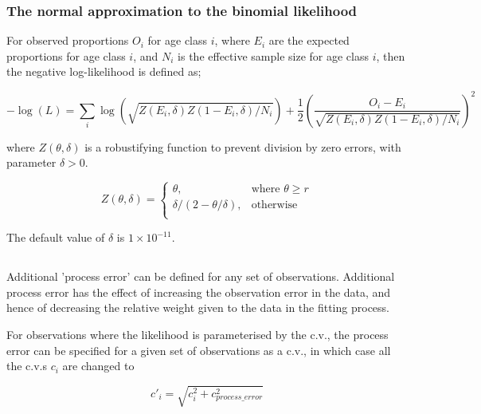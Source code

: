 \subsubsection*{The normal approximation to the binomial likelihood}

For observed proportions $O_i$ for age class $i$, where $E_i$ are the expected proportions for age class $i$, and $N_i$ is the effective sample size for age class $i$, then the negative log-likelihood is defined as;

\begin{equation}
-\log \left(L \right)= \sum\limits_i \log \left( \sqrt{Z\left(E_i,\delta \right)Z\left(1-E_i,\delta\right)/N_i} \right) + \frac{1}{2} \left( \frac{O_i-E_i}{\sqrt{Z\left(E_i,\delta\right)Z\left(1-E_i,\delta \right)/N_i}} \right)^2
\end{equation}

where $Z \left(\theta,\delta \right)$ is a robustifying function to prevent division by zero errors, with parameter $\delta>0$.

\begin{equation}
Z \left(\theta,\delta \right) = \begin{cases}
\theta, & \text{where $\theta \ge r$} \\
\delta/\left( 2-\theta/\delta \right), & \text{otherwise} \\
\end{cases}
\end{equation}

The default value of $\delta$ is $1 \times 10^{-11}$.

\subsection{}

Additional 'process error' can be defined for any set of observations. Additional process error has the effect of increasing the observation error in the data, and hence of decreasing the relative weight given to the data in the fitting process.

For observations where the likelihood is parameterised by the c.v., the process error can be specified for a given set of observations as a c.v., in which case all the c.v.s $c_i$ are changed to

\begin{equation}
  c'_i  = \sqrt {c_i^2  + c_{process\_error}^2 }
\end{equation}

